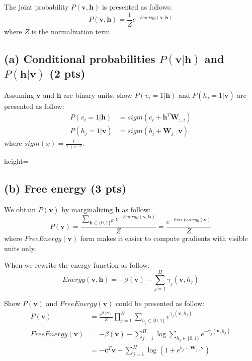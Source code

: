 The joint probability $P(\textbf{v}, \textbf{h})$ is presented as follows:
    \[P(\textbf{v}, \textbf{h})=\frac{1}{Z}e^{-Energy(\textbf{v}, \textbf{h})}\] 
where $Z$ is the normalization term.

\subsection*{(a) Conditional probabilities $P(\textbf{v}|\textbf{h})$ and $P(\textbf{h}|\textbf{v})$ (2 pts)}
Assuming $\textbf{v}$ and $\textbf{h}$ are binary units, show $P(v_i=1 | \textbf{h})$ and $P(h_j = 1 | \textbf{v})$ are presented as follow:
\begin{align*}
    P(v_i=1|\textbf{h}) &= sigm(c_i + \textbf{h}^{T}\textbf{W}_{:,i})\\
    P(h_j=1|\textbf{v}) &= sigm(b_j + \textbf{W}_{j,:}\textbf{v})
\end{align*}
\noindent where $sigm(x) = \frac{1}{1 + e^{-x}}$.

\begin{soln}{height=\textheight}
\end{soln}

\subsection*{(b) Free energy (3 pts)}
We obtain $P(\textbf{v})$ by marginalizing $\textbf{h}$ as follow:
    \[P(\textbf{v}) = \frac{\sum_{\textbf{h} \in \{0, 1\}^{H}} e^{-Energy(\textbf{v}, \textbf{h})}}{Z} = \frac{e^{-FreeEnergy(\textbf{v})}}{Z}\]
where $FreeEnergy(\textbf{v})$ form makes it easier to compute gradients with visible units only. 

When we rewrite the energy function as follow:
  \[Energy(\textbf{v}, \textbf{h})=-\beta(\textbf{v})-\sum_{j=1}^{H}\gamma_j(\textbf{v},h_j)\]

Show $P(\textbf{v})$ and $FreeEnergy(\textbf{v})$ could be presented as follow:
\begin{align*}
    P(\textbf{v}) &= \frac{e^{\beta(\textbf{v})}}{Z}\prod_{j=1}^{H}\sum_{h_j\in\{0, 1\}}e^{\gamma_j(\textbf{v}, h_j)} \\
    FreeEnergy(\textbf{v}) &=-\beta(\textbf{v})-\sum_{j=1}^{H}\log\sum_{h_j\in\{0, 1\}}e^{-\gamma_j(\textbf{v},h_j)} \\
    &= -\textbf{c}^{T}\textbf{v} - \sum_{j=1}^{H}\log\left(1 + e^{b_j + \textbf{W}_{j,:}\textbf{v}}\right)
\end{align*}

